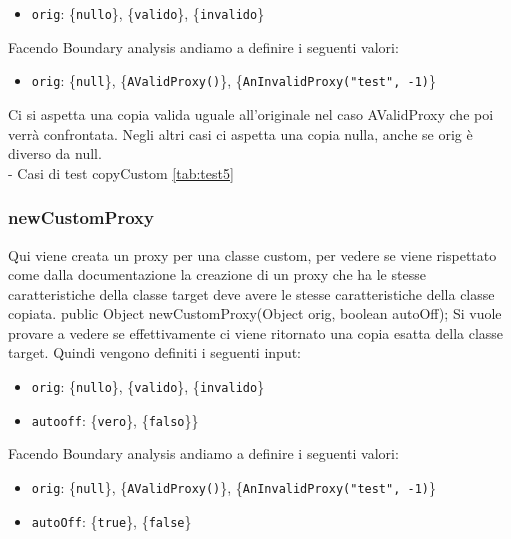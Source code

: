 \documentclass[10pt]{article}
\begin{document}
{		\begin{itemize}[label=--, itemsep=2pt, parsep=0pt]
			\item \texttt{orig}: \{\texttt{nullo}\}, \{\texttt{valido}\}, \{\texttt{invalido}\}
		\end{itemize}
		Facendo Boundary analysis andiamo a definire i seguenti valori:
		\begin{itemize}[label=--, itemsep=2pt, parsep=0pt]
			\item \texttt{orig}: \{\texttt{null}\}, \{\texttt{AValidProxy()}\}, \{\texttt{AnInvalidProxy("test", -1)}\}
		\end{itemize}
		Ci si aspetta una copia valida uguale all'originale nel caso AValidProxy che poi verrà confrontata. 
		Negli altri casi ci aspetta una copia nulla, anche se orig è diverso da null.\\
		- Casi di test copyCustom \autoref{tab:test5}\\
		\subsubsection{newCustomProxy}
		Qui viene creata un proxy per una classe custom, per vedere se viene rispettato come dalla documentazione la creazione di un proxy che ha le stesse caratteristiche della classe target deve avere le stesse caratteristiche della classe copiata.
		public Object newCustomProxy(Object orig, boolean autoOff);
		Si vuole provare a vedere se effettivamente ci viene ritornato una copia esatta della classe target.
		Quindi vengono definiti i seguenti input:
		
		\begin{itemize}[label=--, itemsep=2pt, parsep=0pt]
			\item \texttt{orig}: \{\texttt{nullo}\}, \{\texttt{valido}\}, \{\texttt{invalido}\}
			\item \texttt{autooff}: \{\texttt{vero}\}, \{\texttt{falso}\}\}
		\end{itemize}
		Facendo Boundary analysis andiamo a definire i seguenti valori:
		\begin{itemize}[label=--, itemsep=2pt, parsep=0pt]
			\item \texttt{orig}: \{\texttt{null}\}, \{\texttt{AValidProxy()}\}, \{\texttt{AnInvalidProxy("test", -1)}\}
			\item \texttt{autoOff}: \{\texttt{true}\}, \{\texttt{false}\}
			
		\end{itemize}
}
\end{document}
